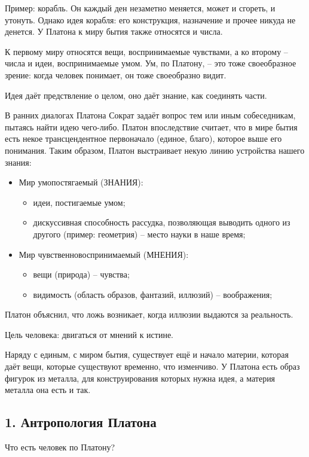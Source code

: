 \documentclass[a4paper, 12pt]{article} %
\begin{document}
Пример: корабль. Он каждый ден незаметно меняется, может и сгореть, и утонуть. Однако идея корабля: его конструкция, назначение и прочее никуда не денется.    
У Платона к миру бытия также относятся и числа.

К первому миру относятся вещи, воспринимаемые чувствами, а ко второму -- числа и идеи, воспринимаемые умом. Ум, по Платону, -- это тоже своеобразное зрение: когда человек понимает, он тоже своеобразно видит. 

Идея даёт предствление о целом, оно даёт знание, как соединять части.

В ранних диалогах Платона Сократ задаёт вопрос тем или иным собеседникам, пытаясь найти идею чего-либо. Платон впоследствие считает, что в мире бытия есть некое трансцендентное первоначало (единое, благо), которое выше его понимания. Таким образом, Платон выстраивает некую линию устройства нашего знания:

\begin{itemize}
\item Мир умопостягаемый (ЗНАНИЯ):
\begin{itemize}
\item идеи, постигаемые умом;
\item дискуссивная способность рассудка, позволяющая выводить одного из другого (пример: геометрия) -- место науки в наше время;
\end{itemize}
\item Мир чувственновоспринимаемый (МНЕНИЯ):
\begin{itemize}
\item вещи (природа) -- чувства;
\item видимость (область образов, фантазий, иллюзий) -- воображения;
\end{itemize}
\end{itemize}

Платон объяснил, что ложь возникает, когда иллюзии выдаются за реальность.

Цель человека: двигаться от мнений к истине.

Наряду с единым, с миром бытия, существует ещё и начало материи, которая даёт вещи, которые существуют временно, что изменчиво. У Платона есть образ фигурок из металла, для конструирования которых нужна идея, а материя металла она есть и так.

\subsection*{1. Антропология Платона}
Что есть человек по Платону?
\end{document}
